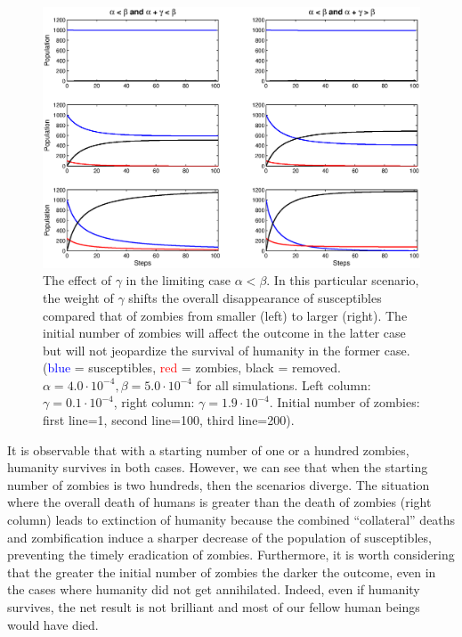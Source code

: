 \documentclass[11pt]{article} %
\begin{document}
\begin{figure}[h!]
\centerline{
\includegraphics[scale=0.55]{../images/Matlab_figures/model-AltB.eps}}
\caption{The effect of $\gamma$ in the limiting case $\alpha<\beta$. In this particular scenario, the weight of $\gamma$ shifts the overall disappearance of susceptibles compared that of zombies from smaller (left) to larger (right). The initial number of zombies will affect the outcome in the latter case but will not jeopardize the survival of humanity in the former case. (\textcolor{blue}{blue} = susceptibles, \textcolor{red}{red} = zombies, black = removed. $\alpha=4.0\cdot10^{-4}, \beta=5.0\cdot10^{-4}$ for all simulations. Left column: $\gamma=0.1\cdot10^{-4}$, right column: $\gamma=1.9\cdot10^{-4}$. Initial number of zombies: first line=1, second line=100, third line=200). \label{gamma_population} }
\end{figure}

It is observable that with a starting number of one or a hundred zombies, humanity survives in both cases. However, we can see that when the starting number of zombies is two hundreds, then the scenarios diverge. The situation where the overall death of humans is greater than the death of zombies (right column) leads to extinction of humanity because the combined ``collateral''  deaths and zombification induce a sharper decrease of the population of susceptibles, preventing the timely eradication of zombies. Furthermore, it is worth considering that the greater the initial number of zombies the darker the outcome, even in the cases where humanity did not get annihilated. Indeed, even if humanity survives, the net result is not brilliant and most of our fellow human beings would have died. 
\end{document}
